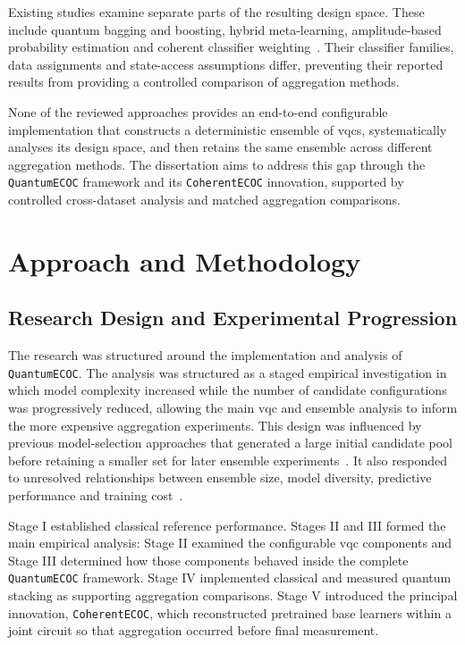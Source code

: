 \documentclass[]{UCD_CS_MSc_AAI_Report}
\begin{document}
Existing studies examine separate parts of the resulting design space. These include quantum bagging and boosting, hybrid meta-learning, amplitude-based probability estimation and coherent classifier weighting~\cite{song_quantum_2024,akrom_bloodbrain_2025,safina_quantum_2023,tolotti_weighted_2025}. Their classifier families, data assignments and state-access assumptions differ, preventing their reported results from providing a controlled comparison of aggregation methods.

None of the reviewed approaches provides an end-to-end configurable implementation that constructs a deterministic ensemble of \acp{vqc}, systematically analyses its design space, and then retains the same ensemble across different aggregation methods. The dissertation aims to address this gap through the \texttt{QuantumECOC} framework and its \texttt{CoherentECOC} innovation, supported by controlled cross-dataset analysis and matched aggregation comparisons.

\chapter{Approach and Methodology}
\label{chap:methodology}

\section{Research Design and Experimental Progression}
\label{sec:method-research-design}

The research was structured around the implementation and analysis of \texttt{QuantumECOC}. The analysis was structured as a staged empirical investigation in which model complexity increased while the number of candidate configurations was progressively reduced, allowing the main \ac{vqc} and ensemble analysis to inform the more expensive aggregation experiments. This design was influenced by previous model-selection approaches that generated a large initial candidate pool before retaining a smaller set for later ensemble experiments~\cite{demir_modified_2018}. It also responded to unresolved relationships between ensemble size, model diversity, predictive performance and training cost~\cite{dong_survey_2020,pinto_composing_2026}.

Stage I established classical reference performance. Stages II and III formed the main empirical analysis: Stage II examined the configurable \ac{vqc} components and Stage III determined how those components behaved inside the complete \texttt{QuantumECOC} framework. Stage IV implemented classical and measured quantum stacking as supporting aggregation comparisons. Stage V introduced the principal innovation, \texttt{CoherentECOC}, which reconstructed pretrained base learners within a joint circuit so that aggregation occurred before final measurement.
\end{document}
